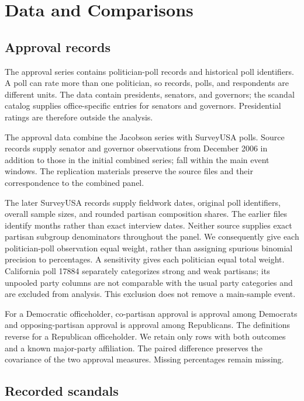 \documentclass[11pt]{article}
\begin{document}
\section{Data and Comparisons}

\subsection{Approval records}

The approval series contains \CountRawRows{} politician-poll records and \CountRawPollIds{} historical poll identifiers. A poll can rate more than one politician, so records, polls, and respondents are different units. The data contain presidents, senators, and governors; the scandal catalog supplies office-specific entries for senators and governors. Presidential ratings are therefore outside the analysis.

The approval data combine the Jacobson series with SurveyUSA polls. Source records supply \CountRestoredRows{} senator and governor observations from December 2006 in addition to those in the initial combined series; \RestoredMain{} fall within the main event windows. The replication materials preserve the source files and their correspondence to the combined panel.

The later SurveyUSA records supply fieldwork dates, original poll identifiers, overall sample sizes, and rounded partisan composition shares. The earlier files identify months rather than exact interview dates. Neither source supplies exact partisan subgroup denominators throughout the panel. We consequently give each politician-poll observation equal weight, rather than assigning spurious binomial precision to percentages. A sensitivity gives each politician equal total weight. California poll 17884 separately categorizes strong and weak partisans; its unpooled party columns are not comparable with the usual party categories and are excluded from analysis. This exclusion does not remove a main-sample event.

For a Democratic officeholder, co-partisan approval is approval among Democrats and opposing-partisan approval is approval among Republicans. The definitions reverse for a Republican officeholder. We retain only rows with both outcomes and a known major-party affiliation. The paired difference preserves the covariance of the two approval measures. Missing percentages remain missing.

\subsection{Recorded scandals}
\end{document}
